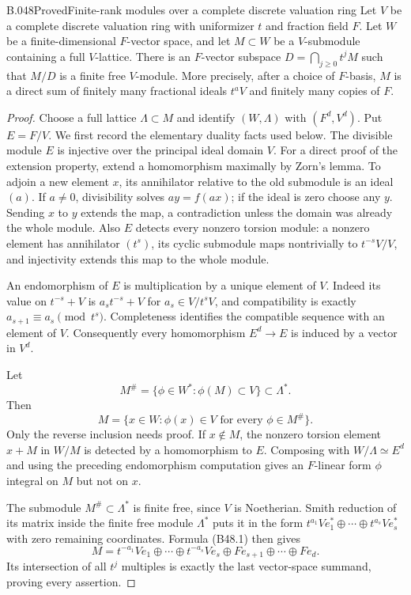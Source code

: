 \begin{saresult}{B.048}{Proved}{Finite-rank modules over a complete discrete valuation ring}
Let $V$ be a complete discrete valuation ring with
uniformizer $t$ and fraction field $F$. Let $W$ be a
finite-dimensional $F$-vector space, and let $M\subset W$
be a $V$-submodule containing a full $V$-lattice.
There is an $F$-vector subspace
$D=\bigcap_{j\ge0}t^jM$ such that $M/D$ is a finite
free $V$-module. More precisely, after a choice of
$F$-basis, $M$ is a direct sum of finitely many
fractional ideals $t^aV$ and finitely many copies of $F$.
\end{saresult}
\begin{proof}
Choose a full lattice $\Lambda\subset M$ and identify
$(W,\Lambda)$ with $(F^d,V^d)$. Put $E=F/V$.
We first record the elementary duality facts used below.
The divisible module $E$ is injective over the principal
ideal domain $V$. For a direct proof of the extension
property, extend a homomorphism maximally by Zorn's
lemma. To adjoin a new element $x$, its annihilator
relative to the old submodule is an ideal $(a)$.
If $a\ne0$, divisibility solves $ay=f(ax)$; if the
ideal is zero choose any $y$. Sending $x$ to $y$
extends the map, a contradiction unless the domain was
already the whole module.
Also $E$ detects every nonzero torsion module: a nonzero
element has annihilator $(t^s)$, its cyclic submodule
maps nontrivially to $t^{-s}V/V$, and injectivity extends
this map to the whole module.

An endomorphism of $E$ is multiplication by a unique
element of $V$. Indeed its value on $t^{-s}+V$ is
$a_s t^{-s}+V$ for $a_s\in V/t^sV$, and compatibility
is exactly $a_{s+1}\equiv a_s\pmod {t^s}$. Completeness
identifies the compatible sequence with an element of
$V$. Consequently every homomorphism $E^d\to E$
is induced by a vector in $V^d$.

Let
\[
 M^\#=\{\phi\in W^*: \phi(M)\subset V\}
                                      \subset\Lambda^*.
\]
Then
\[
 M=\{x\in W: \phi(x)\in V\text{ for every }
                                      \phi\in M^\#\}.       \tag{B48.1}
\]
Only the reverse inclusion needs proof. If $x\notin M$,
the nonzero torsion element $x+M$ in $W/M$ is detected
by a homomorphism to $E$. Composing with
$W/\Lambda\simeq E^d$ and using the preceding
endomorphism computation gives an $F$-linear form
$\phi$ integral on $M$ but not on $x$.

The submodule $M^\#\subset\Lambda^*$ is finite free,
since $V$ is Noetherian. Smith reduction of its matrix
inside the finite free module $\Lambda^*$ puts it in
the form
$t^{a_1}Ve_1^*\oplus\cdots\oplus t^{a_s}Ve_s^*$
with zero remaining coordinates. Formula (B48.1)
then gives
\[
 M=t^{-a_1}Ve_1\oplus\cdots\oplus t^{-a_s}Ve_s
           \oplus Fe_{s+1}\oplus\cdots\oplus Fe_d.
\]
Its intersection of all $t^j$ multiples is exactly the
last vector-space summand, proving every assertion.
\end{proof}

